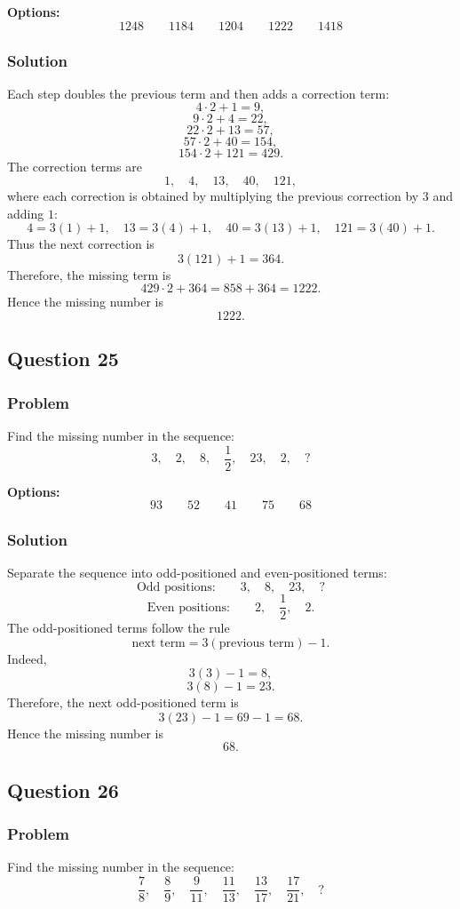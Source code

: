 \documentclass[12pt]{article}
\begin{document}
\noindent\textbf{Options:}
\[
\boxed{1248}
\qquad
\boxed{1184}
\qquad
\boxed{1204}
\qquad
\boxed{1222}
\qquad
\boxed{1418}
\]

\subsubsection{Solution}
Each step doubles the previous term and then adds a correction term:
\[
4\cdot 2+1=9,
\]
\[
9\cdot 2+4=22,
\]
\[
22\cdot 2+13=57,
\]
\[
57\cdot 2+40=154,
\]
\[
154\cdot 2+121=429.
\]
The correction terms are
\[
1,\quad 4,\quad 13,\quad 40,\quad 121,
\]
where each correction is obtained by multiplying the previous correction by \(3\) and adding \(1\):
\[
4=3(1)+1,\quad 13=3(4)+1,\quad 40=3(13)+1,\quad 121=3(40)+1.
\]
Thus the next correction is
\[
3(121)+1=364.
\]
Therefore, the missing term is
\[
429\cdot 2+364=858+364=1222.
\]
Hence the missing number is
\[
\boxed{1222}.
\]

\subsection{Question 25}
\subsubsection{Problem}
Find the missing number in the sequence:
\[
3,\quad 2,\quad 8,\quad \frac{1}{2},\quad 23,\quad 2,\quad ?
\]

\noindent\textbf{Options:}
\[
\boxed{93}
\qquad
\boxed{52}
\qquad
\boxed{41}
\qquad
\boxed{75}
\qquad
\boxed{68}
\]

\subsubsection{Solution}
Separate the sequence into odd-positioned and even-positioned terms:
\[
\text{Odd positions:}\qquad 3,\quad 8,\quad 23,\quad ?
\]
\[
\text{Even positions:}\qquad 2,\quad \frac{1}{2},\quad 2.
\]
The odd-positioned terms follow the rule
\[
\text{next term}=3(\text{previous term})-1.
\]
Indeed,
\[
3(3)-1=8,
\]
\[
3(8)-1=23.
\]
Therefore, the next odd-positioned term is
\[
3(23)-1=69-1=68.
\]
Hence the missing number is
\[
\boxed{68}.
\]

\subsection{Question 26}
\subsubsection{Problem}
Find the missing number in the sequence:
\[
\frac{7}{8},\quad \frac{8}{9},\quad \frac{9}{11},\quad \frac{11}{13},\quad \frac{13}{17},\quad \frac{17}{21},\quad ?
\]
\end{document}
